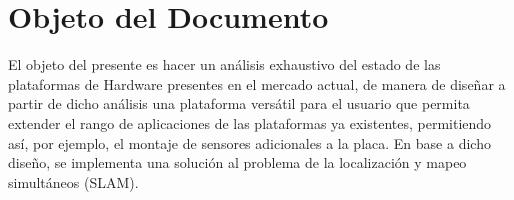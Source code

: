 \section*{Objeto del Documento}
\label{sec:0_objeto}
El objeto del presente es hacer un análisis exhaustivo del estado de las plataformas de Hardware presentes en el mercado actual, de manera de diseñar a partir de dicho análisis una plataforma versátil para el usuario que permita extender el rango de aplicaciones de las plataformas ya existentes, permitiendo así, por ejemplo, el montaje de sensores adicionales a la placa. En base a dicho diseño, se implementa una solución al problema de la localización y mapeo simultáneos (SLAM).